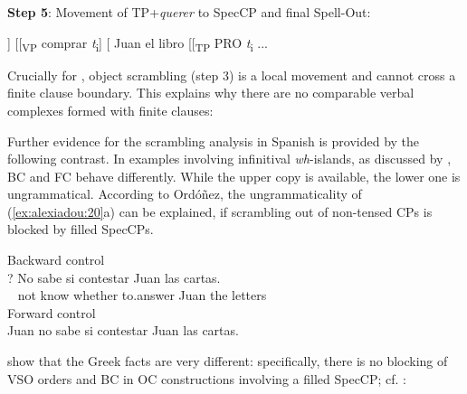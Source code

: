\documentclass[output=paper]{langsci/langscibook}
\begin{document}
    \textsf{\bfseries Step 5}: Movement of TP+\textit{querer} to SpecCP and final Spell-Out:
    \begin{xlista}
    \setcounter{xnumii}{5}
    \ex\relax [\textsubscript{CP} [\textsubscript{TP} querer\textsubscript{i} ... [\textsubscript{VP} \textit{t} ...]] [[\textsubscript{VP} comprar \textit{t}\textsubscript{i}] [ Juan el libro [[\textsubscript{TP} PRO \textit{t}\textsubscript{i} ...
    \end{xlista}
    \z

Crucially for \citet{Ordóñez2009}, object scrambling (step 3) is a local movement and cannot cross a finite clause boundary. This explains why there are no comparable verbal complexes formed with finite clauses:

\ea%
    \label{ex:alexiadou:19}
    \z
\z
    
Further evidence for the scrambling analysis in Spanish is provided by the following contrast. In examples involving infinitival \textit{wh}-islands, as discussed by \citet{Torrego1996}, BC and FC behave differently. While the upper copy is available, the lower one is ungrammatical. According to Ordóñez, the ungrammaticality of (\ref{ex:alexiadou:20}a) can be explained, if scrambling out of non-tensed CPs is blocked by filled SpecCPs.

\ea%
    \label{ex:alexiadou:20}
    \ea Backward control\\
    \gll*? No sabe   si   contestar Juan las cartas. \\
         ~    not   know whether to.answer Juan the letters\\
    \ex Forward control\\Juan no sabe si contestar Juan las cartas.
    \z
\z
           

\citet{Tsakali2017} show that the Greek facts are very different: specifically, there is no blocking of VSO orders and BC in OC constructions involving a filled SpecCP; cf. :
\end{document}
